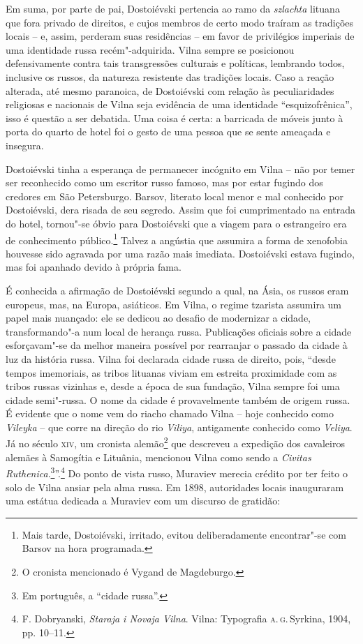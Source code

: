 Em suma, por parte de pai, Dostoiévski pertencia ao ramo da
\textit{szlachta} lituana que fora privado de direitos, e cujos membros de
certo modo traíram as tradições locais -- e, assim, perderam suas
residências -- em favor de privilégios imperiais de uma identidade russa
recém"-adquirida. Vilna sempre se posicionou defensivamente contra tais
transgressões culturais e políticas, lembrando todos, inclusive os
russos, da natureza resistente das tradições locais. Caso a reação
alterada, até mesmo paranoica, de Dostoiévski com relação às
peculiaridades religiosas e nacionais de Vilna seja evidência de uma
identidade ``esquizofrênica'', isso é questão a ser debatida. Uma coisa
é certa: a barricada de móveis junto à porta do quarto de hotel foi o
gesto de uma pessoa que se sente ameaçada e insegura.

Dostoiévski tinha a esperança de permanecer incógnito em Vilna -- não por
temer ser reconhecido como um escritor russo famoso, mas por estar
fugindo dos credores em São Petersburgo. Barsov, literato local menor e
mal conhecido por Dostoiévski, dera risada de seu segredo. Assim que foi
cumprimentado na entrada do hotel, tornou"-se óbvio para Dostoiévski que
a viagem para o estrangeiro era de conhecimento público.\footnote{Mais tarde,
Dostoiévski, irritado, evitou deliberadamente encontrar"-se com Barsov na
hora programada.} Talvez a angústia que assumira a forma de xenofobia
houvesse sido agravada por uma razão mais imediata. Dostoiévski estava
fugindo, mas foi apanhado devido à própria fama.

\asterisc

É conhecida a afirmação de Dostoiévski segundo a qual, na Ásia, os
russos eram europeus, mas, na Europa, asiáticos. Em Vilna, o regime
tzarista assumira um papel mais nuançado: ele se dedicou ao desafio de
modernizar a cidade, transformando"-a num local de herança russa.
Publicações oficiais sobre a cidade esforçavam"-se da melhor maneira
possível por rearranjar o passado da cidade à luz da história russa.
Vilna foi declarada cidade russa de direito, pois, ``desde tempos
imemoriais, as tribos lituanas viviam em estreita proximidade com as
tribos russas vizinhas e, desde a época de sua fundação, Vilna sempre
foi uma cidade semi"-russa. O nome da cidade é provavelmente também de
origem russa. É evidente que o nome vem do riacho chamado Vilna -- hoje
conhecido como \textit{Vileyka} -- que corre na direção do rio
\textit{Viliya}, antigamente conhecido como \textit{Veliya}. Já no século
\textsc{xiv}, um cronista alemão\footnote{O cronista mencionado é Vygand de Magdeburgo.} que descreveu a expedição
dos cavaleiros alemães à Samogítia e Lituânia, mencionou Vilna como
sendo a \textit{Civitas Ruthenica}.\footnote{Em português, a ``cidade russa''.}''.\footnote{F. Dobryanski, \textit{Staraja i Novaja Vilna}. Vilna: Typografia \textsc{a.\,g.}\,Syrkina, 1904, pp. 10--11.}
Do ponto de vista russo, Muraviev merecia crédito por ter feito o solo
de Vilna ansiar pela alma russa. Em 1898, autoridades locais inauguraram
uma estátua dedicada a Muraviev com um discurso de gratidão:

